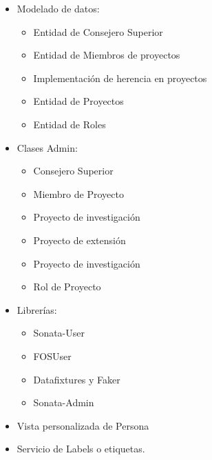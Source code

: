 \begin{itemize}
    \item Modelado de datos:
    \begin{itemize}
        \item Entidad de Consejero Superior
        \item Entidad de Miembros de proyectos
        \item Implementación de herencia en proyectos
        \item Entidad de Proyectos
        \item Entidad de Roles
    \end{itemize}
    \item Clases Admin:
    \begin{itemize}
        \item Consejero Superior
        \item Miembro de Proyecto
        \item Proyecto de investigación
        \item Proyecto de extensión
        \item Proyecto de investigación
        \item Rol de Proyecto
    \end{itemize}
    \item Librerías:
    \begin{itemize}
        \item Sonata-User
        \item FOSUser
        \item Datafixtures y Faker
        \item Sonata-Admin
    \end{itemize}
    \item Vista personalizada de Persona
    \item Servicio de Labels o etiquetas.
\end{itemize}
